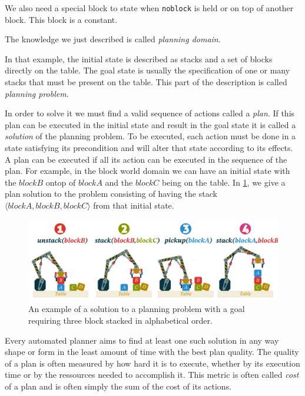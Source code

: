 \documentclass[11pt,a4paper,twoside,openright,titlepage,numbers=noenddot,headinclude,cleardoublepage=empty,openany]{scrreprt}
\theoremstyle{plain}
\theoremstyle{definition}
\theoremstyle{remark}
\newcommand{\passthrough}[1]{#1}
\begin{document}
We also need a special block to state when
\passthrough{\lstinline!noblock!} is held or on top of another block.
This block is a constant.

The knowledge we just described is called \emph{planning domain}.

In that example, the initial state is described as stacks and a set of
blocks directly on the table. The goal state is usually the
specification of one or many stacks that must be present on the table.
This part of the description is called \emph{planning problem}.

In order to solve it we must find a valid sequence of actions called a
\emph{plan}. If this plan can be executed in the initial state and
result in the goal state it is called a \emph{solution} of the planning
problem. To be executed, each action must be done in a state satisfying
its precondition and will alter that state according to its effects. A
plan can be executed if all its action can be executed in the sequence
of the plan. For example, in the block world domain we can have an
initial state with the \(blockB\) ontop of \(blockA\) and the \(blockC\)
being on the table. In \cref{fig:plan}, we give a plan solution to the
problem consisting of having the stack
\(\langle blockA, blockB, blockC \rangle\) from that initial state.

\begin{figure}
\hypertarget{fig:plan}{%
\centering
\includegraphics{./tex2pdf.-0b80fea6fd6da7f9/5c4c0c4f106e93f15c476cd1e84bb549cc1cddd8.pdf}
\caption{An example of a solution to a planning problem with a goal
requiring three block stacked in alphabetical order.}\label{fig:plan}
}
\end{figure}

Every automated planner aims to find at least one such solution in any
way shape or form in the least amount of time with the best plan
quality. The quality of a plan is often measured by how hard it is to
execute, whether by its execution time or by the ressources needed to
accomplish it. This metric is often called \emph{cost} of a plan and is
often simply the sum of the cost of its actions.
\end{document}
